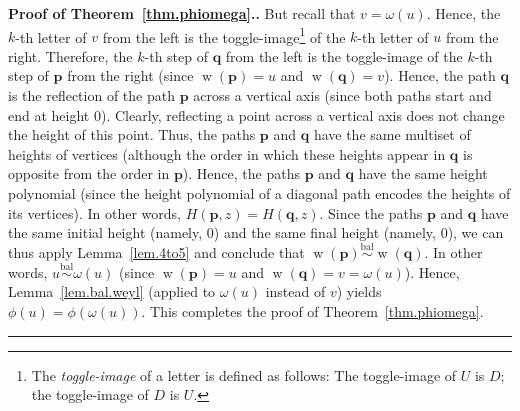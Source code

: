 \documentclass[numbers=enddot,12pt,final,onecolumn,notitlepage]{scrartcl}%
\theoremstyle{definition}
\newenvironment{proof}[1][Proof]{\noindent\textbf{#1.} }{\ \rule{0.5em}{0.5em}}
\newcommand{\pp}{\mathbf{p}}
\newcommand{\qq}{\mathbf{q}}
\newcommand{\NE}{\operatorname{NE}}
\newcommand{\w}{\operatorname{w}}
\newcommand{\balsim}{\overset{\operatorname*{bal}}{\sim}}
\newcommand{\tup}[1]{\left( #1 \right)}
\newenvironment{verlong}{}{}
\begin{document}
\begin{verlong}
\begin{proof}[Proof of Theorem~\ref{thm.phiomega}.]
But recall that $v=\omega\left(  u\right)  $. Hence, the $k$-th letter of $v$
from the left is the toggle-image\footnote{The \emph{toggle-image} of a letter is
defined as follows: The toggle-image of $U$ is $D$; the toggle-image of $D$ is $U$.} of
the $k$-th letter of $u$ from the right. Therefore, the $k$-th step of
$\qq$ from the left is the toggle-image
of the $k$-th step of
$\pp$ from the right (since $\w\left(  \pp\right)  =u$ and
$\w\left(  \qq\right)  =v$). Hence, the path $\qq$ is the
reflection of the path $\pp$ across a vertical axis (since both paths
start and end at height $0$). Clearly, reflecting a point across a vertical
axis does not change the height of this point.
Thus, the paths $\pp$ and $\qq$
have the same multiset of heights of vertices (although the order in which
these heights appear in $\qq$ is opposite from the order in
$\pp$).
Hence, the paths $\pp$ and $\qq$ have the same height polynomial (since the height polynomial of a diagonal path encodes the heights of its vertices).
In other words, $H\tup{\pp, z} = H\tup{\qq, z}$.
Since the paths $\pp$ and $\qq$ have the same initial height (namely, $0$) and the same final height (namely, $0$),
we can thus apply Lemma~\ref{lem.4to5} and conclude that $\w\tup{\pp} \balsim \w\tup{\qq}$.
In other words, $u \balsim \omega\tup{u}$ (since $\w\tup{\pp} = u$ and $\w\tup{\qq} = v = \omega\tup{u}$).
Hence, Lemma~\ref{lem.bal.weyl} (applied to $\omega\tup{u}$ instead of $v$) yields
$\phi\tup{u} = \phi\tup{\omega\tup{u}}$.
This completes the proof of Theorem~\ref{thm.phiomega}.
% 
\end{proof}
\end{verlong}
\end{document}
